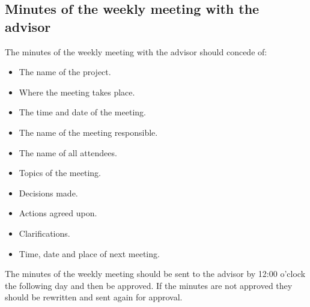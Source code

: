 \newpage
\subsection{Minutes of the weekly meeting with the advisor}
The minutes of the weekly meeting with the advisor should concede of:
\begin{itemize}
\item{}The name of the project.
\item{}Where the meeting takes place.
\item{}The time and date of the meeting.
\item{}The name of the meeting responsible.
\item{}The name of all attendees.
\item{}Topics of the meeting.
\item{}Decisions made.
\item{}Actions agreed upon.
\item{}Clarifications.
\item{}Time, date and place of next meeting.
\end{itemize}
The minutes of the weekly meeting should be sent to the advisor by 12:00 o’clock the following day and then be approved. If the minutes are not approved they should be rewritten and sent again for approval. 


